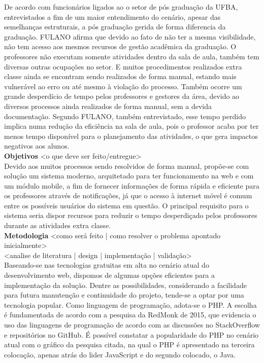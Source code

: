 De acordo com funcionários ligados ao o setor de pós graduação da UFBA, entrevistados a fim de um maior entendimento do cenário, apesar das semelhanças estruturais, a pós graduação gerida de forma diferencia da graduação. FULANO afirma que devido ao fato de não ter a mesma visibilidade, não tem acesso aos mesmos recursos de gestão acadêmica da graduação. O professores não executam somente atividades dentro da sala de aula, também tem diversas outras ocupações no setor. E muitos procedimentos realizados extra classe ainda se encontram sendo realizados de forma manual, estando mais vulnerável ao erro ou até mesmo à violação do processo. Também ocorre um grande desperdício de tempo pelos professores e gestores da área, devido ao diversos processos ainda realizados de forma manual, sem a devida documentação. Segundo FULANO, também entrevistado, esse tempo perdido implica numa redução da eficiência na sala de aula, pois o professor acaba por ter menos tempo disponível para o planejamento das atividades, o que gera impactos negativos aos alunos. \\
\textbf{Objetivos} <o que deve ser feito/entregue> \\
Devido aos muitos processos sendo resolvidos de forma manual, propõe-se com solução um sistema moderno, arquitetado para ter funcionamento na web e com um módulo mobile, a fim de fornecer informações de forma rápida e eficiente para os professores através de notificações, já que o acesso à internet móvel é comum entre os possíveis usuários do sistema em questão.
O principal requisito para o sistema seria dispor recursos para reduzir o tempo desperdiçado pelos professores durante as atividades extra classe. \\
\textbf{Metodologia} <como será feito | como resolver o problema apontado inicialmente>\\
<analise de literatura | design | implementação | validação>\\
Baseando-se nas tecnologias gratuitas em alta no cenário atual do desenvolvimento web, dispomos de algumas opções eficientes para a implementação da solução. Dentre as possibilidades, considerando a facilidade para futura manutenção e continuidade do projeto, tende-se a optar por uma tecnologia popular. Como linguagem de programação, adota-se o PHP. A escolha é fundamentada de acordo com a pesquisa da RedMonk de 2015, que evidencia o uso das linguagens de programação de acordo com as discussões no StackOverflow e repositórios no GitHub. É possível constatar a popularidade do PHP no cenário atual com o gráfico da pesquisa citada, na qual o PHP é apresentado na terceira colocação, apenas atrás do lider JavaScript e do segundo colocado, o Java.

